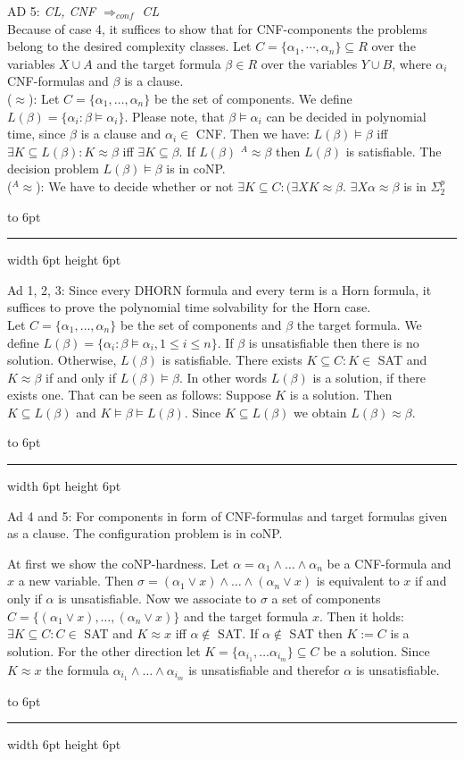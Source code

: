 \documentclass[12pt]{article}
\newcommand{\AEQ}{\mbox{$^A$\hspace{-0.5mm}$\approx$}}
\newenvironment{proof}{\parindent=0pt{\bf Proof: }}{
   \hspace*{\fill}\hbox to 6pt{\leaders\hrule width 6pt height 6pt\hfill}\par}
\begin{document}
\begin{proof}
AD 5: {\em CL, CNF $\Rightarrow_{conf}$ CL}\\
Because of case 4, it suffices to show that for CNF-components the problems belong to the desired complexity classes.
Let $C=\{\alpha_1,\cdots,\alpha_n\} \subseteq R$ over the variables $X \cup A$
and the target formula $\beta \in R$ over the variables $Y \cup B$, where $\alpha_i$ CNF-formulas and $\beta$
is a clause.\\
($\approx$): Let $C=\{\alpha_1, \ldots, \alpha_n\}$ be the set of components. We define
$L(\beta)=\{\alpha_i : \beta \models \alpha_i\}$. Please note, that $\beta \models \alpha_i$ can be decided in polynomial time, since $\beta$ is a clause and $\alpha_i \in$ CNF. Then we have: $L(\beta) \models \beta$ iff
$\exists K \subseteq L(\beta): K \approx \beta$ iff $\exists K \subseteq \beta$. If $L(\beta)$ \AEQ $\beta$ then
$L(\beta)$ is satisfiable. The decision problem $L(\beta) \models \beta$ is in coNP.\\
(\AEQ): We have to decide whether or not $\exists K \subseteq C: (\exists X K \approx \beta$.
$\exists X \alpha \approx \beta$ is in $\Sigma^p_2$

\end{proof}
\begin{proof}
Ad 1, 2, 3: Since every DHORN formula and every term is a Horn formula, it suffices to prove the polynomial time solvability for the Horn case.\\
Let $C=\{ \alpha_1, \ldots, \alpha_n\}$ be the set of components and $\beta$ the target formula. We define
$L(\beta) =\{\alpha_i : \beta \models \alpha_i, 1 \leq i \leq n\}$. If $\beta$ is unsatisfiable  then there is no solution. Otherwise, $L(\beta)$ is satisfiable.
There exists $K \subseteq C: K \in$ SAT and $K \approx \beta$ if and only if $L(\beta) \models \beta$. In other words
$L(\beta)$ is a solution, if there exists one. That can be seen as follows: Suppose $K $ is a solution. Then
$K \subseteq L(\beta)$ and $K \models \beta \models L(\beta)$. Since $K \subseteq L(\beta)$ we obtain
$L(\beta) \approx \beta$.
\end{proof}


\begin{proof}
Ad 4 and 5: For components in form of CNF-formulas and target formulas given as a clause. The configuration problem is in coNP.

At first we show the coNP-hardness. Let $\alpha= \alpha_1 \wedge \ldots \wedge \alpha_n$ be a CNF-formula and $x$ a new variable. Then $\sigma= (\alpha_1 \vee x) \wedge \ldots \wedge (\alpha_n \vee x)$ is equivalent to $x$ if and only if
$\alpha$ is unsatisfiable. Now we associate to $\sigma$ a set of components $C=\{(\alpha_1 \vee x), \ldots,(\alpha_n \vee x)\}$ and the target formula $x$. Then it holds:\\
$\exists K \subseteq C: C \in$ SAT and $K \approx x$ iff $\alpha \not \in$ SAT. If $\alpha \not \in$ SAT then $K:= C$
is a solution. For the other direction let $K=\{\alpha_{i_1}, \ldots \alpha_{i_m}\} \subseteq C$ be a solution.
Since  $K \approx x$ the formula $\alpha_{i_1} \wedge \ldots \wedge \alpha_{i_m}$ is unsatisfiable and therefor $\alpha$ is unsatisfiable.
\end{proof}
\end{document}
